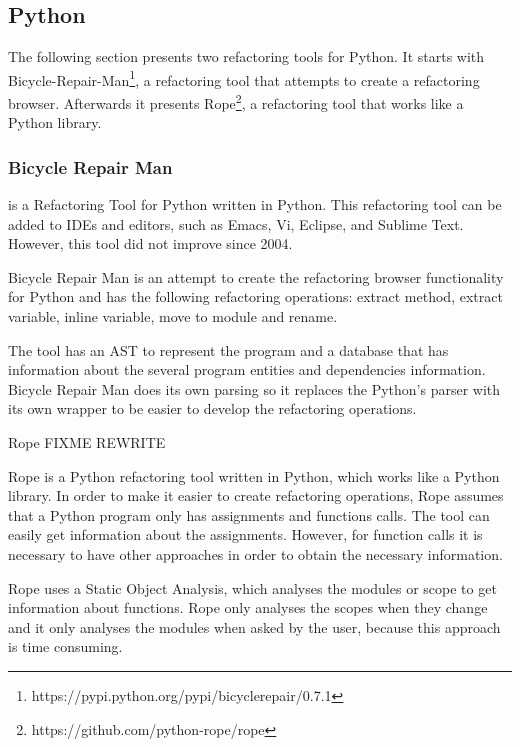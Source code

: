 
\subsection{Python}

The following section presents two refactoring tools for Python.
It starts with Bicycle-Repair-Man\footnote{https://pypi.python.org/pypi/bicyclerepair/0.7.1},
 a refactoring tool that attempts to create a refactoring browser.
Afterwards it presents Rope\footnote{https://github.com/python-rope/rope}, a
refactoring tool that works like a Python library.

\subsubsection{Bicycle Repair Man} %

 is a Refactoring Tool for Python written in Python.
 This refactoring tool can be added to IDEs and editors, such as Emacs, Vi, Eclipse,
  and Sublime Text. However, this tool did not improve since 2004.

Bicycle Repair Man is an attempt to create the refactoring browser functionality for
 Python and has the following refactoring operations: extract method, extract variable, inline variable, move to module and rename.

The tool has an AST to represent the program and a database that has information
about the several program entities and dependencies information.
Bicycle Repair Man does its own parsing so it replaces the Python's parser with
its own wrapper to be easier to develop the refactoring operations.


Rope FIXME REWRITE

Rope is a Python refactoring tool written in Python, which works like a Python library.
In order to make it easier to create refactoring operations, Rope assumes that a
Python program only has assignments and functions calls. %
The tool can easily get information about the assignments.
However, for function calls it is necessary to have other approaches in order to
obtain the necessary information.

Rope uses a Static Object Analysis, which analyses the modules or scope to get
information about functions.
Rope only analyses the scopes when they change and it only analyses the modules
when asked by the user, because this approach is time consuming.

